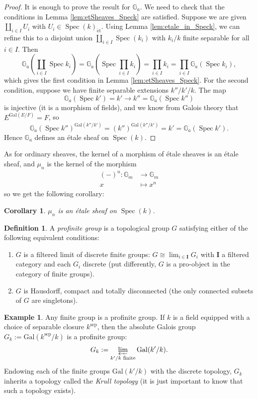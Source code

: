 \documentclass{article}
\numberwithin{equation}{section}
\numberwithin{figure}{section}
\newcommand{\G}{\mathbb{G}}
\newcommand{\Spec}{\mathop{\mathrm{Spec}}}
\newcommand{\et}{\acute{\mathrm{e}}\mathrm{t}}
\newcommand{\sep}{\mathrm{sep}}
\newcommand{\Gal}{\mathrm{Gal}}
\theoremstyle{plain}
\newtheorem{cor}[thm]{Corollary}
\theoremstyle{definition}
\newtheorem{defn}[thm]{Definition}
\newtheorem{ex}[thm]{Example}
\theoremstyle{remark}
\begin{document}
\begin{proof}
    It is enough to prove the result for $\G_a$. We need to check that the conditions in Lemma \ref{lem:etSheaves_Speck} are satisfied. Suppose we are given $\coprod_{i \in I}U_i$ with $U_i \in \Spec(k)_{\et}$. Using Lemma \ref{lem:etale_in_Speck}, we can refine this to a disjoint union $\coprod_{i \in I} \Spec(k_i)$ with $k_i/k$ finite separable for all $i \in I$. Then
    \[\G_a\left(\coprod_{i \in I} \Spec{k_i}\right) = \G_a\left(\Spec{\prod_{i \in I} k_i} \right) = \prod_{i \in I} k_i = \prod_{i\in I} \G_a\left(\Spec{k_i}\right),\]
    which gives the first condition in Lemma \ref{lem:etSheaves_Speck}. For the second condition, suppose we have finite separable extensions $k''/k'/k$. The map
    \[\G_a(\Spec{k'}) = k' \to k'' = \G_a(\Spec{k''})\]
    is injective (it is a morphism of fields), and we know from Galois theory that $E^{\Gal(E/F)} = F$, so 
    \[\G_a(\Spec{k''})^{\Gal(k''/k')} = (k'')^{\Gal(k''/k')} = k'= \G_a(\Spec{k'}).\]
    Hence $\G_a$ defines an \'etale sheaf on $\Spec(k)$.
\end{proof}
As for ordinary sheaves, the kernel of a morphism of \'etale sheaves is an \'etale sheaf, and $\mu_n$ is the kernel of the morphism
\begin{align*}(-)^n: \G_m &\to \G_m \\ x &\mapsto x^n\end{align*}
so we get the following corollary:
\begin{cor}
    $\mu_n$ is an \'etale sheaf on $\Spec(k)$.
\end{cor}

\begin{defn}
    A \emph{profinite group} is a topological group $G$ satisfying either of the following equivalent conditions:
    \begin{enumerate}
        \item $G$ is a filtered limit of discrete finite groups: $G \cong \lim_{i \in \mathbf{I}} G_i$ with $\mathbf{I}$ a filtered category and each $G_i$ discrete (put differently, $G$ is a pro-object in the category of finite groups).
        \item $G$ is Hausdorff, compact and totally disconnected (the only connected subsets of $G$ are singletons).
    \end{enumerate}
\end{defn}

\begin{ex}
    Any finite group is a profinite group. If $k$ is a field equipped with a choice of separable closure $k^{\sep}$, then the absolute Galois group $G_k := \Gal(k^{\sep}/k)$ is a profinite group: 
    \[G_k := \varprojlim_{k'/k \text{ finite}} \Gal(k'/k).\]
    Endowing each of the finite groups $\Gal(k'/k)$ with the discrete topology, $G_k$ inherits a topology called the \emph{Krull topology} (it is just important to know that such a topology exists).
\end{ex}
\end{document}
